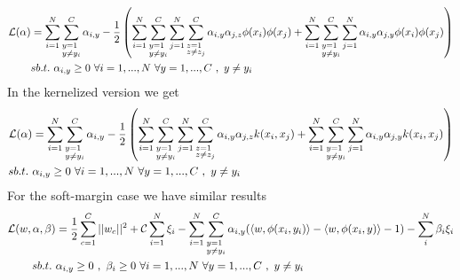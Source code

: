 \begin{align}
	\mathcal{L}(\alpha) &= \sum_{i=1}^N \sum_{\begin{subarray}{l} y=1 \\ y\neq y_i \end{subarray}}^C \alpha_{i,y} -\frac{1}{2}\left( \sum_{i=1}^N \sum_{\begin{subarray}{l} y=1 \\ y\neq y_i \end{subarray}}^C 
		\sum_{j=1}^N \sum_{\begin{subarray}{l} z=1 \\ z\neq z_j \end{subarray}}^C 
	   \alpha_{i,y} \alpha_{j,z} \phi(x_i) \phi(x_j) 
	 +\sum_{i=1}^N \sum_{\begin{subarray}{l} y=1 \\ y\neq y_i \end{subarray}}^C 
	\sum_{j=1}^N 
	   \alpha_{i,y} \alpha_{j,y} \phi(x_i) \phi(x_j) 
	  \right)\\
	&sb.t. ~ \alpha_{i,y} \geq 0 ~ \forall i = 1,...,N ~ \forall y = 1,...,C ~ ,~ y\neq y_i\notag
\end{align}
In the kernelized version we get
\begin{align}
	\mathcal{L}(\alpha) &= \sum_{i=1}^N \sum_{\begin{subarray}{l} y=1 \\ y\neq y_i \end{subarray}}^C \alpha_{i,y} -\frac{1}{2}\left( \sum_{i=1}^N \sum_{\begin{subarray}{l} y=1 \\ y\neq y_i \end{subarray}}^C 
		\sum_{j=1}^N \sum_{\begin{subarray}{l} z=1 \\ z\neq z_j \end{subarray}}^C 
	   \alpha_{i,y} \alpha_{j,z} k(x_i,x_j)
	 +\sum_{i=1}^N \sum_{\begin{subarray}{l} y=1 \\ y\neq y_i \end{subarray}}^C 
	\sum_{j=1}^N 
	   \alpha_{i,y} \alpha_{j,y} k(x_i,x_j) 
	  \right)\\
	sb.t. ~ &\alpha_{i,y} \geq 0 ~ \forall i = 1,...,N ~ \forall y = 1,...,C ~ ,~ y\neq y_i\notag
\end{align}
For the soft-margin case we have similar results
\begin{align} 
	\mathcal{L}(w,\alpha, \beta) &=
	\frac{1}{2} \sum_{c=1}^C ||w_c||^2 + \mathcal{C}\sum_{i=1}^N \xi_i - 
	\sum_{i=1}^N \sum_{\begin{subarray}{l} y=1 \\ y\neq y_i \end{subarray}}^C
	\alpha_{i,y}(\langle w, \phi(x_i,y_i)\rangle - \langle w, \phi(x_i,y)\rangle - 1 )
	- \sum_{i}^N  \beta_i \xi_i \\
	sb.t. ~ &\alpha_{i,y} \geq 0 ~, ~\beta_i \geq 0 ~ \forall i = 1,...,N ~ \forall y = 1,...,C ~ ,~ y\neq y_i\notag
\end{align}
